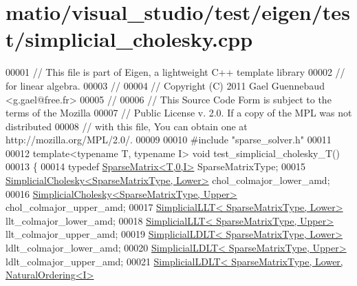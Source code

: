 \hypertarget{matio_2visual__studio_2test_2eigen_2test_2simplicial__cholesky_8cpp_source}{}\section{matio/visual\+\_\+studio/test/eigen/test/simplicial\+\_\+cholesky.cpp}
\label{matio_2visual__studio_2test_2eigen_2test_2simplicial__cholesky_8cpp_source}

\begin{DoxyCode}
00001 \textcolor{comment}{// This file is part of Eigen, a lightweight C++ template library}
00002 \textcolor{comment}{// for linear algebra.}
00003 \textcolor{comment}{//}
00004 \textcolor{comment}{// Copyright (C) 2011 Gael Guennebaud <g.gael@free.fr>}
00005 \textcolor{comment}{//}
00006 \textcolor{comment}{// This Source Code Form is subject to the terms of the Mozilla}
00007 \textcolor{comment}{// Public License v. 2.0. If a copy of the MPL was not distributed}
00008 \textcolor{comment}{// with this file, You can obtain one at http://mozilla.org/MPL/2.0/.}
00009 
00010 \textcolor{preprocessor}{#include "sparse\_solver.h"}
00011 
00012 \textcolor{keyword}{template}<\textcolor{keyword}{typename} T, \textcolor{keyword}{typename} I> \textcolor{keywordtype}{void} test\_simplicial\_cholesky\_T()
00013 \{
00014   \textcolor{keyword}{typedef} \hyperlink{group___sparse_core___module_class_eigen_1_1_sparse_matrix}{SparseMatrix<T,0,I>} SparseMatrixType;
00015   \hyperlink{group___sparse_cholesky___module_class_eigen_1_1_simplicial_cholesky}{SimplicialCholesky<SparseMatrixType, Lower>} 
      chol\_colmajor\_lower\_amd;
00016   \hyperlink{group___sparse_cholesky___module_class_eigen_1_1_simplicial_cholesky}{SimplicialCholesky<SparseMatrixType, Upper>} 
      chol\_colmajor\_upper\_amd;
00017   \hyperlink{group___sparse_cholesky___module_class_eigen_1_1_simplicial_l_l_t}{SimplicialLLT<     SparseMatrixType, Lower>} 
      llt\_colmajor\_lower\_amd;
00018   \hyperlink{group___sparse_cholesky___module_class_eigen_1_1_simplicial_l_l_t}{SimplicialLLT<     SparseMatrixType, Upper>} 
      llt\_colmajor\_upper\_amd;
00019   \hyperlink{group___sparse_cholesky___module_class_eigen_1_1_simplicial_l_d_l_t}{SimplicialLDLT<    SparseMatrixType, Lower>} 
      ldlt\_colmajor\_lower\_amd;
00020   \hyperlink{group___sparse_cholesky___module_class_eigen_1_1_simplicial_l_d_l_t}{SimplicialLDLT<    SparseMatrixType, Upper>} 
      ldlt\_colmajor\_upper\_amd;
00021   \hyperlink{group___sparse_cholesky___module_class_eigen_1_1_simplicial_l_d_l_t}{SimplicialLDLT<    SparseMatrixType, Lower, NaturalOrdering<I>}

\end{DoxyCode}
